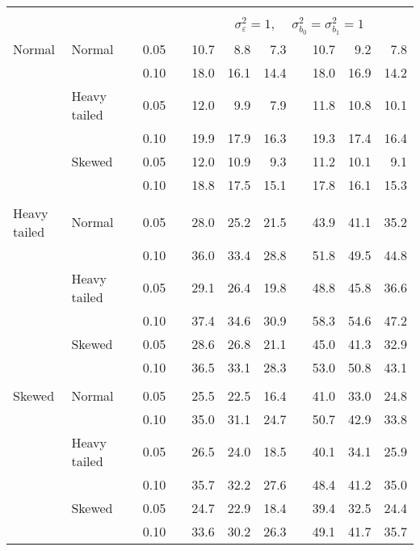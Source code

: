 \begin{table}[ht]
\begin{scriptsize}
\begin{tabular}{ll p{.1cm} c p{.1cm} rrr p{.1cm} rrr}
&&&&&&&&&&&\\
& && && \multicolumn{7}{c}{$\sigma_{\varepsilon}^2 = 1$, \ \ $\sigma_{b_0}^2 = \sigma_{b_1}^2 = 1$} \\ \cline{6-12}
\rowcolor{gray!20} Normal & Normal &  & 0.05 &  & 10.7 & 8.8 & 7.3 &  & 10.7 & 9.2 & 7.8 \\ 
\rowcolor{gray!20}    &  &  & 0.10 &  & 18.0 & 16.1 & 14.4 &  & 18.0 & 16.9 & 14.2 \\ 
\rowcolor{gray!20}    & Heavy tailed &  & 0.05 &  & 12.0 & 9.9 & 7.9 &  & 11.8 & 10.8 & 10.1 \\
\rowcolor{gray!20}    &  &  & 0.10 &  & 19.9 & 17.9 & 16.3 &  & 19.3 & 17.4 & 16.4 \\ 
\rowcolor{gray!20}    & Skewed &  & 0.05 &  & 12.0 & 10.9 & 9.3 &  & 11.2 & 10.1 & 9.1 \\ 
\rowcolor{gray!20}    &  &  & 0.10 &  & 18.8 & 17.5 & 15.1 &  & 17.8 & 16.1 & 15.3 \\ 
&&&&&&&&&&&\\
  Heavy tailed & Normal &  & 0.05 &  & 28.0 & 25.2 & 21.5 &  & 43.9 & 41.1 & 35.2 \\ 
   &  &  & 0.10 &  & 36.0 & 33.4 & 28.8 &  & 51.8 & 49.5 & 44.8 \\ 
   & Heavy tailed &  & 0.05 &  & 29.1 & 26.4 & 19.8 &  & 48.8 & 45.8 & 36.6 \\ 
   &  &  & 0.10 &  & 37.4 & 34.6 & 30.9 &  & 58.3 & 54.6 & 47.2 \\ 
   & Skewed &  & 0.05 &  & 28.6 & 26.8 & 21.1 &  & 45.0 & 41.3 & 32.9 \\ 
   &  &  & 0.10 &  & 36.5 & 33.1 & 28.3 &  & 53.0 & 50.8 & 43.1 \\ 
 &&&&&&&&&&&\\ 
  Skewed & Normal &  & 0.05 &  & 25.5 & 22.5 & 16.4 &  & 41.0 & 33.0 & 24.8 \\ 
   &  &  & 0.10 &  & 35.0 & 31.1 & 24.7 &  & 50.7 & 42.9 & 33.8 \\ 
   & Heavy tailed &  & 0.05 &  & 26.5 & 24.0 & 18.5 &  & 40.1 & 34.1 & 25.9 \\ 
   &  &  & 0.10 &  & 35.7 & 32.2 & 27.6 &  & 48.4 & 41.2 & 35.0 \\ 
   & Skewed &  & 0.05 &  & 24.7 & 22.9 & 18.4 &  & 39.4 & 32.5 & 24.4 \\ 
   &  &  & 0.10 &  & 33.6 & 30.2 & 26.3 &  & 49.1 & 41.7 & 35.7 \\ 



\end{tabular}
\end{scriptsize}
\end{table}
